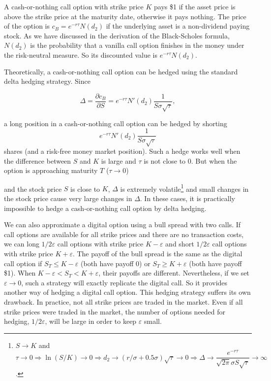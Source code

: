 \begin{solution}
A cash-or-nothing call option with strike price $K$ pays \$1 if the asset price is above
the strike price at the maturity date, otherwise it pays nothing. The price of the option is
$c_B=e^{-r\tau}N(d_2)$ if the underlying asset is a non-dividend paying stock. As we have
discussed in the derivation of the Black-Scholes formula, $N(d_2)$ is the probability that
a vanilla call option finishes in the money under the risk-neutral measure. So its discounted
value is $e^{-r\tau}N(d_2)$.

Theoretically, a cash-or-nothing call option can be hedged using the standard delta hedging
strategy. Since

\[
\Delta=\frac{\partial c_B}{\partial S}=e^{-r\tau}N'(d_2)\frac{1}{S\sigma\sqrt{\tau}},
\]

a long position in a cash-or-nothing call option can be hedged by shorting
\[
e^{-r\tau}N'(d_2)\frac{1}{S\sigma\sqrt{\tau}}
\]
shares (and a risk-free money market
position). Such a hedge works well when the difference between $S$ and $K$ is large and
$\tau$ is not close to 0. But when the option is approaching maturity $T$ ($\tau\to0$)


and the stock price $S$ is close to $K$, $\Delta$ is extremely volatile\footnote[12]{$S\to K$
and $\tau\to0\Rightarrow\ln(S/K)\to0\Rightarrow d_2\to(r/\sigma+0.5\sigma)\sqrt{\tau}\to0
\Rightarrow\Delta\to\dfrac{e^{-r\tau}}{\sqrt{2\pi}\sigma S\sqrt{\tau}}\to\infty$.} and small changes in the stock price cause very large changes in $\Delta$. In these cases, it is
practically impossible to hedge a cash-or-nothing call option by delta hedging.

We can also approximate a digital option using a bull spread with two calls. If call options
are available for all strike prices and there are no transaction costs, we can long
$1/2\varepsilon$ call options with strike price $K-\varepsilon$ and short $1/2\varepsilon$
call options with strike price $K+\varepsilon$. The payoff of the bull spread is the same as
the digital call option if $S_T\leq K-\varepsilon$ (both have payoff 0) or
$S_T\geq K+\varepsilon$ (both have payoff \$1). When $K-\varepsilon<S_T<K+\varepsilon$,
their payoffs are different. Nevertheless, if we set $\varepsilon\to0$, such a strategy will
exactly replicate the digital call. So it provides another way of hedging a digital call option.
This hedging strategy suffers its own drawback. In practice, not all strike prices are traded
in the market. Even if all strike prices were traded in the market, the number of options
needed for hedging, $1/2\varepsilon$, will be large in order to keep $\varepsilon$ small.

\end{solution}

